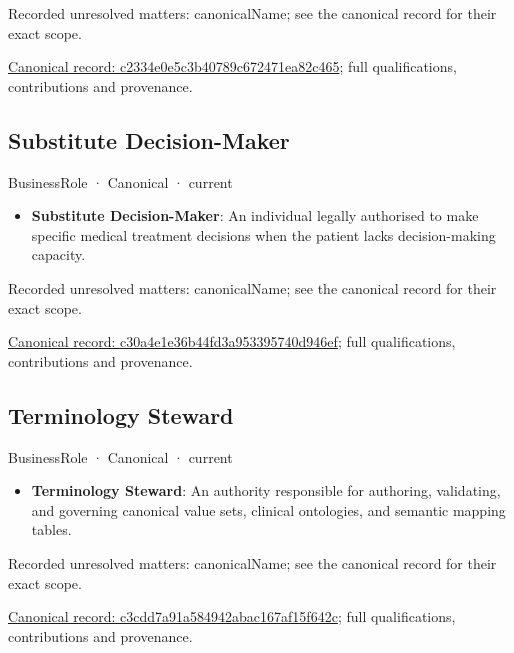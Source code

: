 {\small Recorded unresolved matters: canonicalName; see the canonical record for their exact scope.}\par
{\footnotesize \href{../../../../continuum/business/business-role/c2334e0e5c3b40789c672471ea82c465.md}{Canonical record: c2334e0e5c3b40789c672471ea82c465}; full qualifications, contributions and provenance.}\par
\subsection{Substitute Decision-Maker}

\label{element:c30a4e1e36b44fd3a953395740d946ef}
{\small BusinessRole · Canonical · current}\par

\begin{itemize}


\item \textbf{Substitute Decision-Maker}: An individual legally authorised to make specific medical treatment decisions when the patient lacks decision-making capacity.

\end{itemize}

{\small Recorded unresolved matters: canonicalName; see the canonical record for their exact scope.}\par
{\footnotesize \href{../../../../continuum/business/business-role/c30a4e1e36b44fd3a953395740d946ef.md}{Canonical record: c30a4e1e36b44fd3a953395740d946ef}; full qualifications, contributions and provenance.}\par
\subsection{Terminology Steward}

\label{element:c3cdd7a91a584942abac167af15f642c}
{\small BusinessRole · Canonical · current}\par

\begin{itemize}


\item \textbf{Terminology Steward}: An authority responsible for authoring, validating, and governing canonical value sets, clinical ontologies, and semantic mapping tables.

\end{itemize}

{\small Recorded unresolved matters: canonicalName; see the canonical record for their exact scope.}\par
{\footnotesize \href{../../../../continuum/business/business-role/c3cdd7a91a584942abac167af15f642c.md}{Canonical record: c3cdd7a91a584942abac167af15f642c}; full qualifications, contributions and provenance.}\par
